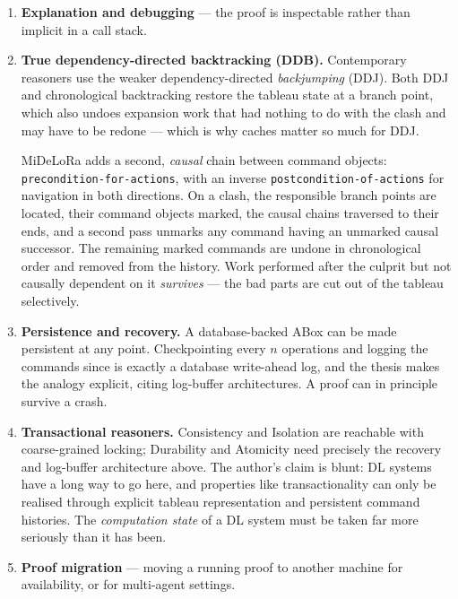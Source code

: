 \documentclass[11pt,a4paper,DIV=12,parskip=half]{scrartcl}
\begin{document}
\begin{enumerate}
\item \textbf{Explanation and debugging} --- the proof is inspectable rather than
  implicit in a call stack.

\item \textbf{True dependency-directed backtracking (DDB).} Contemporary
  reasoners use the weaker dependency-directed \emph{backjumping} (DDJ). Both
  DDJ and chronological backtracking restore the tableau state at a branch point,
  which also undoes expansion work that had nothing to do with the clash and may
  have to be redone --- which is why caches matter so much for DDJ.

  MiDeLoRa adds a second, \emph{causal} chain between command objects:
  \texttt{pre\-condition-\allowbreak for-\allowbreak actions}, with an inverse
  \texttt{post\-condition-\allowbreak of-\allowbreak actions} for navigation in both directions. On a
  clash, the responsible branch points are located, their command objects
  marked, the causal chains traversed to their ends, and a second pass unmarks
  any command having an unmarked causal successor. The remaining marked commands
  are undone in chronological order and removed from the history. Work performed
  after the culprit but not causally dependent on it \emph{survives} --- the bad
  parts are cut out of the tableau selectively.

\item \textbf{Persistence and recovery.} A database-backed ABox can be made
  persistent at any point. Checkpointing every $n$ operations and logging the
  commands since is exactly a database write-ahead log, and the thesis makes the
  analogy explicit, citing log-buffer architectures. A proof can in principle
  survive a crash.

\item \textbf{Transactional reasoners.} Consistency and Isolation are reachable
  with coarse-grained locking; Durability and Atomicity need precisely the
  recovery and log-buffer architecture above. The author's claim is blunt: DL
  systems have a long way to go here, and properties like transactionality can
  only be realised through explicit tableau representation and persistent command
  histories. The \emph{computation state} of a DL system must be taken far more
  seriously than it has been.

\item \textbf{Proof migration} --- moving a running proof to another machine for
  availability, or for multi-agent settings.
\end{enumerate}
\end{document}

